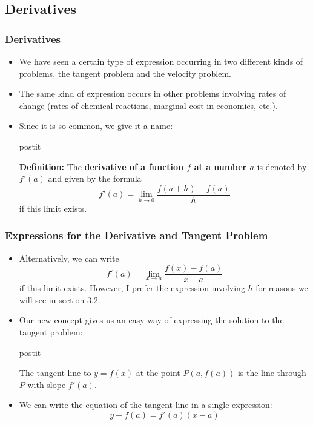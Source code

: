 \documentclass[serif,ignorenonframetext]{beamer}
\begin{document}
\subsection{Derivatives}

\begin{frame}
  \frametitle{Derivatives}
  \begin{itemize}
  \item We have seen a certain type of expression occurring in two different
    kinds of problems, the tangent problem and the velocity problem.
  \pause
  \item The same kind of expression occurs in other problems involving
    rates of change (rates of chemical reactions, marginal cost in economics,
    etc.).
  \pause
  \item Since it is so common, we give it a name:
  \pause

  \begin{beamercolorbox}{postit}

    \textbf{Definition:} The \textbf{derivative of a function $f$ at a
    number $a$} is denoted by $f'(a)$ and given by the formula
    \begin{displaymath}
      f'(a) = \lim_{h\to 0} \frac{f(a+h)-f(a)}{h}
    \end{displaymath}
    if this limit exists.

  \end{beamercolorbox}

  \end{itemize}
\end{frame}

\begin{frame}
  \frametitle{Expressions for the Derivative and Tangent Problem}
  \begin{itemize}
  \item Alternatively, we can write
    \begin{displaymath}
      f'(a) = \lim_{x\to a} \frac{f(x)-f(a)}{x-a}
    \end{displaymath}
    if this limit exists.
  \pause
    However, I prefer the expression involving $h$ for reasons we will see
    in section 3.2.
  \pause
  \item Our new concept gives us an easy way of expressing the
    solution to the tangent problem:

    \begin{beamercolorbox}{postit}

      The tangent line to $y=f(x)$ at the point $P(a,f(a))$ is the line
      through $P$ with slope $f'(a)$.

    \end{beamercolorbox} 
    \pause

  \item We can write the equation of the tangent line in a single expression:
    \begin{displaymath}
      y-f(a) = f'(a) (x-a)
    \end{displaymath}
  \end{itemize}
\end{frame}
\end{document}
